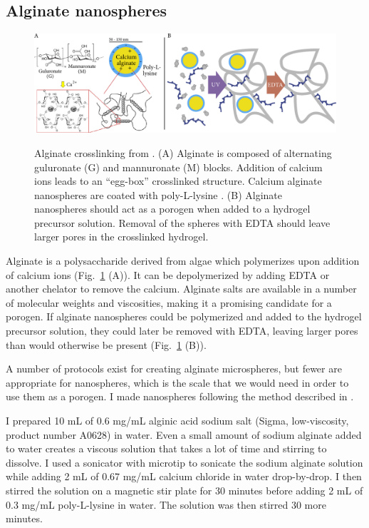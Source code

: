 \subsection{Alginate nanospheres}
\begin{figure}
\caption{Alginate crosslinking from \cite{bruchet15}.  (A) Alginate is composed of alternating guluronate (G) and mannuronate (M) blocks.  Addition of calcium ions leads to an ``egg-box'' crosslinked structure. Calcium alginate nanospheres are coated with poly-L-lysine \cite{de03}.  (B) Alginate nanospheres should act as a porogen when added to a hydrogel precursor solution.  Removal of the spheres with EDTA should leave larger pores in the crosslinked hydrogel.}
\centering
\includegraphics[width=\textwidth]{figs/ch03/alginate-cartoon2}
\label{fig:alginate}
\end{figure}

Alginate is a polysaccharide derived from algae which polymerizes upon addition of calcium ions (Fig.~\ref{fig:alginate} (A)).  It can be depolymerized by adding EDTA or another chelator to remove the calcium.  Alginate salts are available in a number of molecular weights and viscosities, making it a promising candidate for a porogen.  If alginate nanospheres could be polymerized and added to the hydrogel precursor solution, they could later be removed with EDTA, leaving larger pores than would otherwise be present (Fig.~\ref{fig:alginate} (B)).

A number of protocols exist for creating alginate microspheres, but fewer are appropriate for nanospheres, which is the scale that we would need in order to use them as a porogen.  I made nanospheres following the method described in \cite{de03}.

I prepared 10 mL of 0.6 mg/mL alginic acid sodium salt (Sigma, low-viscosity, product number A0628) in water.  Even a small amount of sodium alginate added to water creates a viscous solution that takes a lot of time and stirring to dissolve.  I used a sonicator with  microtip to sonicate the sodium alginate solution while adding 2 mL of 0.67 mg/mL calcium chloride in water drop-by-drop.  I then stirred the solution on a magnetic stir plate for 30 minutes before adding 2 mL of 0.3 mg/mL poly-L-lysine in water.  The solution was then stirred 30 more minutes.

